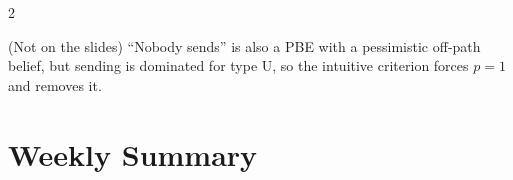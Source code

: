 \documentclass[a4paper,9pt]{extarticle}
\begin{document}
\begin{multicols}{2}
\begin{important}
\begin{itemize}
\end{itemize}

\end{important}


\begin{warning}

(Not on the slides) ``Nobody sends'' is also a PBE with a pessimistic off-path belief, but
sending is dominated for type U, so the intuitive criterion forces $p = 1$ and removes it.

\end{warning}



\section{Weekly Summary}





\end{multicols}
\end{document}
